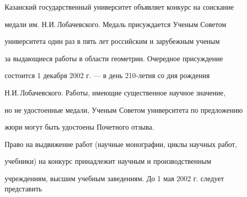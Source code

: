 









\setcounter{page}{80}





\date{}




\pagestyle{plain} %







\maketitle





Казанский государственный университет объявляет конкурс на соискание


медали им. Н.И.\,Лобачевского. Медаль присуждается Ученым Советом


университета один раз в пять лет российским и зарубежным ученым


за выдающиеся работы в области геометрии. Очередное присуждение


состоится 1 декабря 2002 г. --- в день 210-летия со дня рождения


Н.И.\,Лобачевского. Работы, имеющие существенное научное значение,


но не удостоенные медали, Ученым Советом университета по предложению


жюри могут быть удостоены Почетного отзыва.





Право на выдвижение работ (научные монографии, циклы научных работ,


учебники) на конкурс принадлежит научным и производственным


учреждениям, высшим учебным заведениям. До 1 мая 2002 г. следует представить


